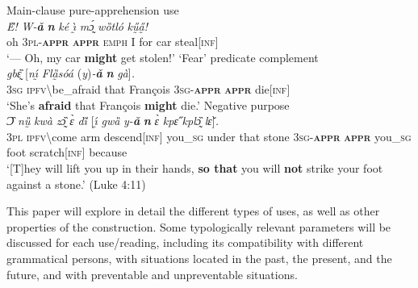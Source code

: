 \documentclass[output=paper,colorlinks,citecolor=brown
]{langscibook}
\begin{document}
\ea \label{ex:Fed1} \textnormal{Main-clause pure-apprehension use} \\
\gll \textit{E̋!} \textit{W-\textbf{ǎ}} \textit{\textbf{n{\ù}}} \textit{ké} \textit{ı̰̀} \textit{mɔ̰́} \textit{wȍtló} \textit{kṵ̋a̰̋!} \\
oh \textsc{3pl-\textbf{appr}} \textsc{\textbf{appr}} \textsc{emph} I for car steal\textsc{[inf]} \\
 `--- Oh, my car \textbf{might} get stolen!'
\ex \label{ex:Fed2} \textnormal{`Fear' predicate complement}\\
\gll \textit{{\E}} \textit{gbɛ̰̏} \textup{[}\textit{n\'{ı̰}} \textit{Flȁ̰sóá} \textup{(}\textit{y}\textup{)}\textit{-\textbf{ǎ}} \textit{\textbf{n{\ù}}} \textit{gà}\textup{]}\textit{.} \\
\textsc{3sg} \textsc{\textsc{ipfv}\backslash}be\_afraid that François \textsc{3sg-\textbf{appr}} \textsc{\textbf{appr}} die\textsc{[inf]} \\
\glt `She's \textbf{afraid} that François \textbf{might} die.'
\ex \label{ex:Fed3} \textnormal{Negative purpose} \\
\gll \textit{Ɔ̏} \textit{nṵ̏} \textit{kwà} \textit{zɔ̰̏} \textit{ɛ̀} \textit{di̋} \textup{[}\textit{ı̰́} \textit{gwȁ} \textit{y-\textbf{ǎ}} \textit{\textbf{n{\ù}}} \textit{ɛ̀} \textit{kpɛ̋} \textit{kplɔ̰̏} \textit{lɛ̌}\textup{]}\textit{.} \\
\textsc{3pl} \textsc{ipfv}\backslash come arm descend\textsc{[inf]} {you\_\textsc{sg}} under that stone \textsc{3sg-\textbf{appr}} \textsc{\textbf{appr}} you\_\textsc{sg} foot scratch\textsc{[inf]} because \\
\glt `[T]hey will lift you up in their hands, \textbf{so that} you will \textbf{not} strike your foot against a stone.' (Luke 4:11)
\z


This paper will explore in detail the different types of uses, as well as other properties of the construction. Some typologically relevant parameters will be discussed for each use\slash reading, including its compatibility with different grammatical persons, with situations located in the past, the present, and the future, and with preventable and unpreventable situations.
\end{document}
